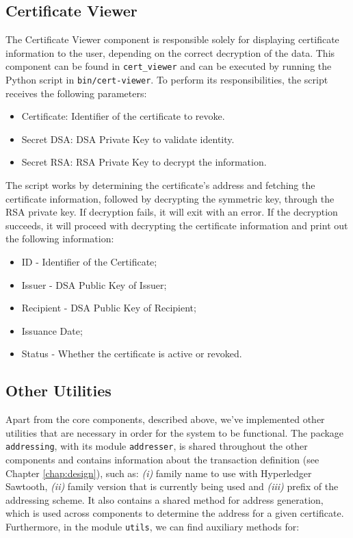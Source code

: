\subsection{Certificate Viewer}

The Certificate Viewer component is responsible solely for displaying certificate information to the user, depending on the correct decryption of the data.  This component can be found in \texttt{cert\_viewer} and can be executed by running the Python script in \texttt{bin/cert-viewer}. To perform its responsibilities, the script receives the following parameters:

\begin{itemize}
	\item Certificate: Identifier of the certificate to revoke.
	\item Secret DSA: DSA Private Key to validate identity.
	\item Secret RSA: RSA Private Key to decrypt the information.
\end{itemize}

The script works by determining the certificate's address and fetching the certificate information, followed by decrypting the symmetric key, through the RSA private key. If decryption fails, it will exit with an error. If the decryption succeeds, it will proceed with decrypting the certificate information and print out the following information:

\begin{itemize}
	\item ID - Identifier of the Certificate;
	\item Issuer - DSA Public Key of Issuer;
	\item Recipient - DSA Public Key of Recipient;
	\item Issuance Date;
	\item Status - Whether the certificate is active or revoked.
\end{itemize}

\subsection{Other Utilities}

Apart from the core components, described above, we've implemented other utilities that are necessary in order for the system to be functional. The package \texttt{addressing}, with its module \texttt{addresser}, is shared throughout the other components and contains  information about the transaction definition (see Chapter \ref{chap:design}), such as: \emph{(i)} family name to use with Hyperledger Sawtooth, \emph{(ii)} family version that is currently being used and \emph{(iii)} prefix of the addressing scheme. It also contains a shared method for address generation, which is used across components to determine the address for a given certificate. Furthermore, in the module \texttt{utils}, we can find auxiliary methods for:

